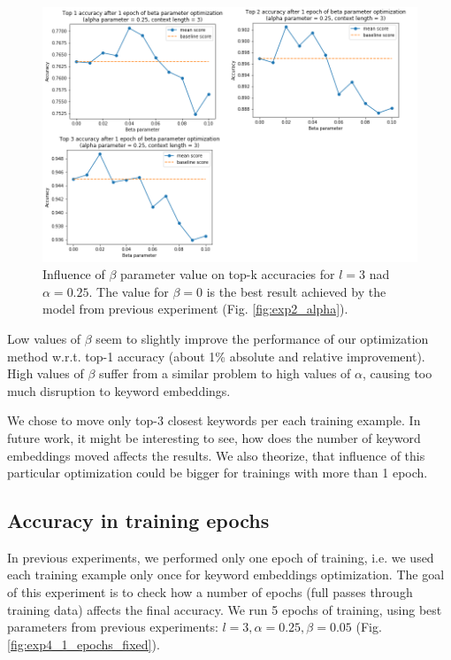 \documentclass{llncs}
\begin{document}
\begin{figure}
    \centering
    \caption{Influence of \(\beta\) parameter value on top-k accuracies for \(l=3\) nad \(\alpha=0.25\). The value for \(\beta=0\) is the best result achieved by the model from previous experiment (Fig. \ref{fig:exp2_alpha}).}
    \label{fig:exp3_beta}
    \includegraphics[scale=0.65]{res/exp3_beta_top_acc.png}
\end{figure}

Low values of \(\beta\) seem to slightly improve the performance of our optimization method w.r.t. top-1 accuracy (about 1\% absolute and relative improvement).
High values of \(\beta\) suffer from a similar problem to high values of \(\alpha\), causing too much disruption to keyword embeddings.

We chose to move only top-3 closest keywords per each training example. In future work, it might be interesting to see, how does the number of keyword embeddings moved affects the results. We also theorize, that influence of this particular optimization could be bigger for trainings with more than 1 epoch.

\subsection{Accuracy in training epochs}
\label{sec:exp_epochs}
In previous experiments, we performed only one epoch of training, i.e. we used each training example only once for keyword embeddings optimization.
The goal of this experiment is to check how a number of epochs (full passes through training data) affects the final accuracy.
We run 5 epochs of training, using best parameters from previous experiments: \(l=3, \alpha=0.25, \beta=0.05\) (Fig. \ref{fig:exp4_1_epochs_fixed}).
\end{document}
